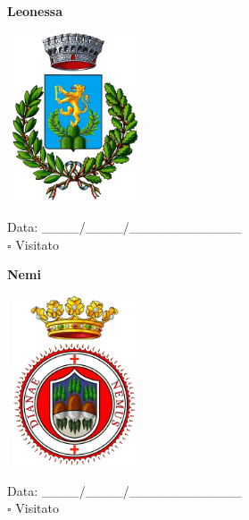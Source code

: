 \documentclass[a5paper,12pt]{article}
\begin{document}
\newpage

\noindent
\begin{minipage}[t]{0.45\textwidth}
    \begin{center}
        \textbf{Leonessa}
    \end{center}
    \vspace{-0.5cm} %
    \begin{center}
        \includegraphics[height= 5cm, width=4cm]{Lazio/Stemma Leonessa.png}
    \end{center}
    \vspace{-0.4cm} %
    \begin{flushleft}
        Data: \_\_\_\_/\_\_\_\_/\_\_\_\_\_\_\_\_\_\_\_\_ \\
        $\square$ Visitato
    \end{flushleft}
\end{minipage}
\hfill
\noindent
\begin{minipage}[t]{0.45\textwidth}
    \begin{center}
        \textbf{Nemi}
    \end{center}
    \vspace{-0.5cm} %
    \begin{center}
        \includegraphics[height= 5cm, width=4cm]{Lazio/Stemma Nemi.png}
    \end{center}
    \vspace{-0.4cm} %
    \begin{flushleft}
        Data: \_\_\_\_/\_\_\_\_/\_\_\_\_\_\_\_\_\_\_\_\_ \\
        $\square$ Visitato
    \end{flushleft}
\end{minipage}
\end{document}
